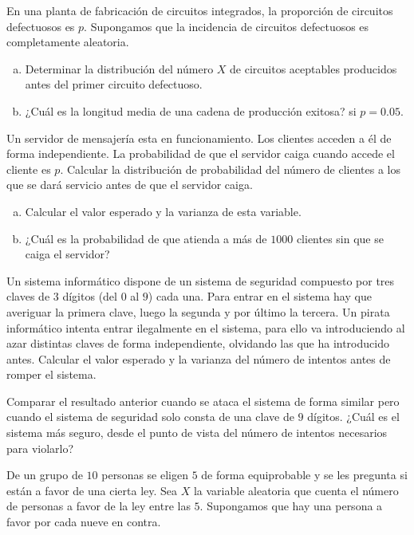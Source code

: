\documentclass[12pt]{article}
\begin{document}
\probl  En una planta de fabricación de circuitos integrados, la proporción de circuitos
defectuosos es $p$. Supongamos que la incidencia de circuitos defectuosos es completamente
aleatoria.
\begin{enumerate}[a)]
\item  Determinar la distribución del número $X$ de circuitos
aceptables producidos antes del primer circuito defectuoso.
\item  ¿Cuál es la longitud media de una cadena de producción exitosa? si
$p = 0.05.$
\end{enumerate}

\probl Un servidor de mensajería esta en funcionamiento. Los clientes acceden a él de forma
independiente. La probabilidad de que el servidor caiga cuando accede el cliente es $p$.
Calcular la distribución de probabilidad del número de clientes a los que se dará servicio
antes de que el servidor caiga.

\begin{enumerate}[a)]
\item Calcular el valor esperado y la varianza de esta variable.
\item  ¿Cuál es la probabilidad de que atienda a más de $1000$ clientes sin que se
caiga el servidor?
\end{enumerate}

\probl Un sistema informático  dispone de un sistema de seguridad compuesto por tres claves
de $3$ dígitos (del $0$ al $9$) cada una. Para entrar en el sistema hay que averiguar la
primera clave, luego la segunda y por último la tercera. Un pirata informático intenta
entrar ilegalmente en el sistema, para ello va introduciendo al azar distintas claves de
forma independiente, olvidando las que ha introducido antes. Calcular el valor esperado y
la varianza del número de intentos antes de romper el sistema.

Comparar el resultado anterior cuando se ataca el sistema de forma similar pero cuando el
sistema de seguridad solo consta de una clave de $9$ dígitos. ¿Cuál es el sistema más
seguro, desde el punto de vista del número de intentos necesarios para violarlo?




\probl De un grupo de $10$ personas se eligen $5$ de forma equiprobable y se les pregunta
si están a favor de una cierta ley. Sea $X$ la variable aleatoria que cuenta el número de
personas a favor de la ley entre las $5$. Supongamos que hay una persona a favor por cada
nueve en contra.
\end{document}

